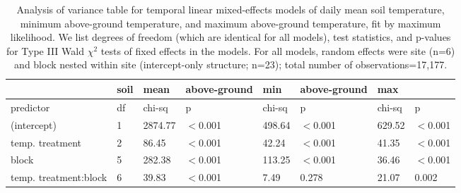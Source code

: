 \documentclass{article}
\begin{document}
\begin{table}[ht]
\centering
\caption{Analysis of variance table for temporal linear mixed-effects models of daily mean soil temperature, minimum above-ground temperature, and maximum above-ground temperature, fit by maximum likelihood. We list degrees of freedom (which are identical for all models), test statistics, and p-values for Type III Wald $\chi^{2}$ tests of fixed effects in the models. For all models, random effects were site (n=6) and block nested within site (intercept-only structure; n=23); total number of observations=17,177.} 
\label{table:blocks_time}
\begin{tabular}{|p{}|p{}|p{}p{}|p{}p{}|p{}p{}|}
   \hline
 & soil & mean & above-ground & min & above-ground & max &  \\ 
   \hline
predictor & df & chi-sq & p & chi-sq & p & chi-sq & p \\ 
   \hline
(intercept) & 1 & 2874.77 & $<$0.001 & 498.64 & $<$0.001 & 629.52 & $<$0.001 \\ 
  temp. treatment & 2 & 86.45 & $<$0.001 & 42.24 & $<$0.001 & 41.35 & $<$0.001 \\ 
  block & 5 & 282.38 & $<$0.001 & 113.25 & $<$0.001 & 36.46 & $<$0.001 \\ 
  temp. treatment:block & 6 & 39.83 & $<$0.001 & 7.49 & 0.278 & 21.07 & 0.002 \\ 
   \hline
\end{tabular}
\end{table}\clearpage
\end{document}
